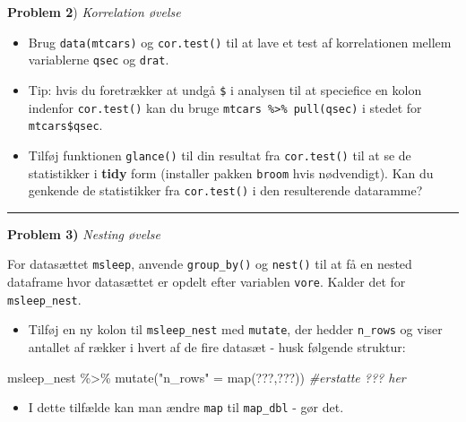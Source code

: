 \documentclass[
]{book}
\newenvironment{Shaded}{\begin{snugshade}}{\end{snugshade}}
\newcommand{\CommentTok}[1]{\textcolor[rgb]{0.56,0.35,0.01}{\textit{#1}}}
\newcommand{\FunctionTok}[1]{\textcolor[rgb]{0.00,0.00,0.00}{#1}}
\newcommand{\NormalTok}[1]{#1}
\newcommand{\OtherTok}[1]{\textcolor[rgb]{0.56,0.35,0.01}{#1}}
\newcommand{\SpecialCharTok}[1]{\textcolor[rgb]{0.00,0.00,0.00}{#1}}
\newcommand{\StringTok}[1]{\textcolor[rgb]{0.31,0.60,0.02}{#1}}
\providecommand{\tightlist}{%
  \setlength{\itemsep}{0pt}\setlength{\parskip}{0pt}}
\begin{document}
\textbf{Problem 2}) \emph{Korrelation øvelse}

\begin{itemize}
\item
  Brug \texttt{data(mtcars)} og \texttt{cor.test()} til at lave et test af korrelationen mellem variablerne \texttt{qsec} og \texttt{drat}.
\item
  Tip: hvis du foretrækker at undgå \texttt{\$} i analysen til at speciefice en kolon indenfor \texttt{cor.test()} kan du bruge \texttt{mtcars\ \%\textgreater{}\%\ pull(qsec)} i stedet for \texttt{mtcars\$qsec}.
\item
  Tilføj funktionen \texttt{glance()} til din resultat fra \texttt{cor.test()} til at se de statistikker i
  \textbf{tidy} form (installer pakken \texttt{broom} hvis nødvendigt). Kan du genkende de statistikker fra \texttt{cor.test()} i den resulterende dataramme?
\end{itemize}

\begin{center}\rule{0.5\linewidth}{0.5pt}\end{center}

\textbf{Problem 3)} \emph{Nesting øvelse}

For datasættet \texttt{msleep}, anvende \texttt{group\_by()} og \texttt{nest()} til at få en nested dataframe hvor datasættet er opdelt efter variablen \texttt{vore}. Kalder det for \texttt{msleep\_nest}.

\begin{itemize}
\tightlist
\item
  Tilføj en ny kolon til \texttt{msleep\_nest} med \texttt{mutate}, der hedder \texttt{n\_rows} og viser antallet af rækker i hvert af de fire datasæt - husk følgende struktur:
\end{itemize}

\begin{Shaded}
\begin{Highlighting}[]
\NormalTok{msleep\_nest }\SpecialCharTok{\%\textgreater{}\%}
  \FunctionTok{mutate}\NormalTok{(}\StringTok{"n\_rows"} \OtherTok{=} \FunctionTok{map}\NormalTok{(???,???)) }\CommentTok{\#erstatte ??? her}
\end{Highlighting}
\end{Shaded}

\begin{itemize}
\tightlist
\item
  I dette tilfælde kan man ændre \texttt{map} til \texttt{map\_dbl} - gør det.
\end{itemize}
\end{document}
